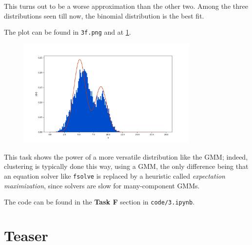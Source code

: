 This turns out to be a worse approximation than the other two. Among the three
distributions seen till now, the binomial distribution is the best fit.

The plot can be found in \texttt{3f.png} and at \ref{fig_a3f}.

\begin{figure}[H]
    \centering
    \includegraphics[width=0.8\textwidth]{assets/images/a3f.png}
    \caption{}
    \label{fig_a3f}
\end{figure}

\begin{tcolorbox}[title=]
    This task shows the power of a more versatile distribution like the GMM;
    indeed, clustering is typically done this way, using a GMM, the only
    difference being that an equation solver like \texttt{fsolve} is replaced by
    a heuristic called \textit{expectation maximization}, since solvers are slow
    for many-component GMMs.
\end{tcolorbox}

The code can be found in the \textbf{Task F} section in \texttt{code/3.ipynb}.

\section*{\colS{$\S$} Teaser}

